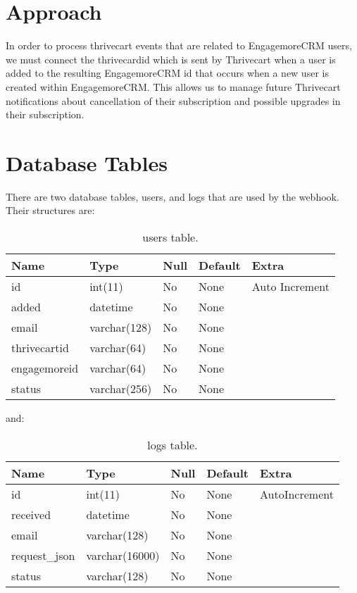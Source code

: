 \documentclass[final,letterpaper,12pt]{article}
\begin{document}
\section{Approach}
\noindent In order to process thrivecart events that are related to EngagemoreCRM users, we must connect
the thrivecardid which is sent by Thrivecart when a user is added to the resulting EngagemoreCRM id that
occurs when a new user is created within EngagemoreCRM.  This allows us to manage future Thrivecart
notifications about cancellation of their subscription and possible upgrades in their subscription.

\section{Database Tables}
\noindent There are two database tables, users, and logs that are used by the webhook.  Their structures are:
\smallskip
\begin{table}[ht]
\begin{tabular}{|l|l|l|l|l|}
\hline
Name&Type&Null&Default&Extra\\ \hline
id&int(11)&No&None&Auto Increment\\
added&datetime&No&None&\\
email&varchar(128)&No&None&\\
thrivecartid&varchar(64)&No&None&\\
engagemoreid&varchar(64)&No&None&\\
status&varchar(256)&No&None&\\
\hline
\end{tabular}
\caption{\label{tab:users}users table.}
\end{table}
\newpage
\noindent and:
\begin{table}[ht]
\begin{tabular}{|l|l|l|l|l|}
\hline
Name&Type&Null&Default&Extra\\ \hline
id&int(11)&No&None&AutoIncrement\\
received&datetime&No&None&\\
email&varchar(128)&No&None&\\
request\_json&varchar(16000)&No&None&\\
status&varchar(128)&No&None&\\
\hline
\end{tabular}
\caption{\label{tab:logs}logs table.}
\end{table}
\end{document}
